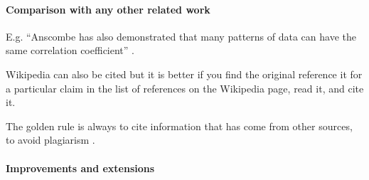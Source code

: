 \documentclass[11pt,a4paper]{article}
\begin{document}
\paragraph{Comparison with any other related work}
E.g. ``Anscombe has also demonstrated that many patterns of data can
have the same correlation coefficient'' \cite{anscombe1973graphs}.

Wikipedia can also be cited but it is better if you find the original
reference it for a particular claim in the list of references on the
Wikipedia page, read it, and cite it.

The golden rule is always to cite information that has come from other
sources, to avoid plagiarism \cite{wiki:plagarism}.

\paragraph{Improvements and extensions}


\printbibliography
\end{document}
